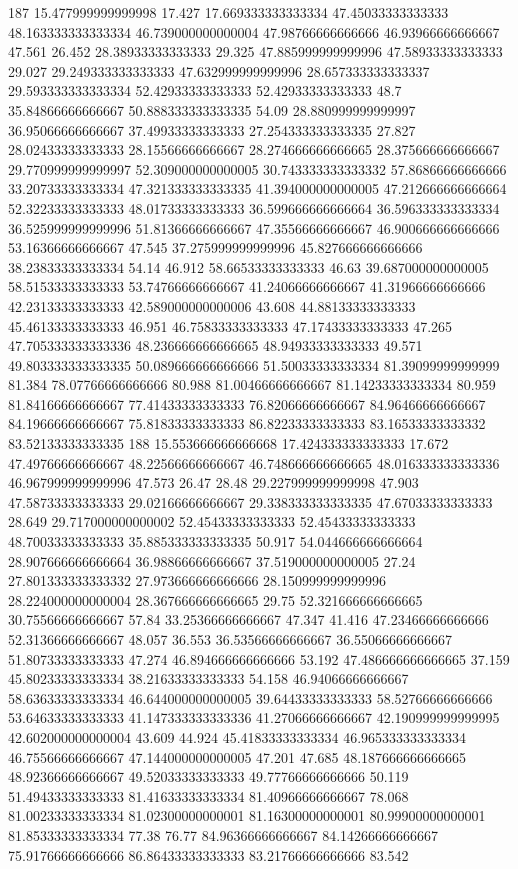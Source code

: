 187 15.477999999999998 17.427 17.669333333333334 47.45033333333333 48.163333333333334 46.739000000000004 47.98766666666666 46.93966666666667 47.561 26.452 28.38933333333333 29.325 47.885999999999996 47.58933333333333 29.027 29.249333333333333 47.632999999999996 28.657333333333337 29.593333333333334 52.42933333333333 52.42933333333333 48.7 35.84866666666667 50.888333333333335 54.09 28.880999999999997 36.95066666666667 37.49933333333333 27.254333333333335 27.827 28.02433333333333 28.15566666666667 28.274666666666665 28.375666666666667 29.770999999999997 52.309000000000005 30.743333333333332 57.86866666666666 33.20733333333334 47.321333333333335 41.394000000000005 47.212666666666664 52.32233333333333 48.01733333333333 36.599666666666664 36.596333333333334 36.525999999999996 51.81366666666667 47.35566666666667 46.900666666666666 53.16366666666667 47.545 37.275999999999996 45.827666666666666 38.23833333333334 54.14 46.912 58.66533333333333 46.63 39.687000000000005 58.51533333333333 53.74766666666667 41.24066666666667 41.31966666666666 42.23133333333333 42.589000000000006 43.608 44.88133333333333 45.46133333333333 46.951 46.75833333333333 47.17433333333333 47.265 47.705333333333336 48.236666666666665 48.94933333333333 49.571 49.803333333333335 50.089666666666666 51.50033333333334 81.39099999999999 81.384 78.07766666666666 80.988 81.00466666666667 81.14233333333334 80.959 81.84166666666667 77.41433333333333 76.82066666666667 84.96466666666667 84.19666666666667 75.81833333333333 86.82233333333333 83.16533333333332 83.52133333333335
188 15.553666666666668 17.424333333333333 17.672 47.49766666666667 48.22566666666667 46.748666666666665 48.016333333333336 46.967999999999996 47.573 26.47 28.48 29.227999999999998 47.903 47.58733333333333 29.02166666666667 29.338333333333335 47.67033333333333 28.649 29.717000000000002 52.45433333333333 52.45433333333333 48.70033333333333 35.885333333333335 50.917 54.044666666666664 28.907666666666664 36.98866666666667 37.519000000000005 27.24 27.801333333333332 27.973666666666666 28.150999999999996 28.224000000000004 28.367666666666665 29.75 52.321666666666665 30.75566666666667 57.84 33.25366666666667 47.347 41.416 47.23466666666666 52.31366666666667 48.057 36.553 36.53566666666667 36.55066666666667 51.80733333333333 47.274 46.894666666666666 53.192 47.486666666666665 37.159 45.80233333333334 38.21633333333333 54.158 46.94066666666667 58.63633333333334 46.644000000000005 39.64433333333333 58.52766666666666 53.64633333333333 41.147333333333336 41.27066666666667 42.190999999999995 42.602000000000004 43.609 44.924 45.41833333333334 46.965333333333334 46.75566666666667 47.144000000000005 47.201 47.685 48.187666666666665 48.92366666666667 49.52033333333333 49.77766666666666 50.119 51.49433333333333 81.41633333333334 81.40966666666667 78.068 81.00233333333334 81.02300000000001 81.16300000000001 80.99900000000001 81.85333333333334 77.38 76.77 84.96366666666667 84.14266666666667 75.91766666666666 86.86433333333333 83.21766666666666 83.542
